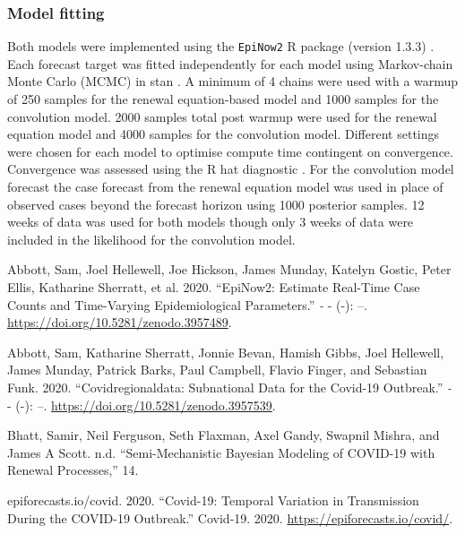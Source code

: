 \hypertarget{model-fitting}{%
\subsubsection*{Model fitting}\label{model-fitting}}

Both models were implemented using the \texttt{EpiNow2} R package (version 1.3.3) \citep{epinow2}. Each forecast target was fitted independently for each model using Markov-chain Monte Carlo (MCMC) in stan \citep{rstan}. A minimum of 4 chains were used with a warmup of 250 samples for the renewal equation-based model and 1000 samples for the convolution model. 2000 samples total post warmup were used for the renewal equation model and 4000 samples for the convolution model. Different settings were chosen for each model to optimise compute time contingent on convergence. Convergence was assessed using the R hat diagnostic \citep{rstan}. For the convolution model forecast the case forecast from the renewal equation model was used in place of observed cases beyond the forecast horizon using 1000 posterior samples. 12 weeks of data was used for both models though only 3 weeks of data were included in the likelihood for the convolution model.

\clearpage

\hypertarget{refs}{}
\leavevmode{}%
Abbott, Sam, Joel Hellewell, Joe Hickson, James Munday, Katelyn Gostic, Peter Ellis, Katharine Sherratt, et al. 2020. {``EpiNow2: Estimate Real-Time Case Counts and Time-Varying Epidemiological Parameters.''} \emph{-} - (-): --. \url{https://doi.org/10.5281/zenodo.3957489}.

\leavevmode{}%
Abbott, Sam, Katharine Sherratt, Jonnie Bevan, Hamish Gibbs, Joel Hellewell, James Munday, Patrick Barks, Paul Campbell, Flavio Finger, and Sebastian Funk. 2020. {``Covidregionaldata: Subnational Data for the Covid-19 Outbreak.''} \emph{-} - (-): --. \url{https://doi.org/10.5281/zenodo.3957539}.

\leavevmode{}%
Bhatt, Samir, Neil Ferguson, Seth Flaxman, Axel Gandy, Swapnil Mishra, and James A Scott. n.d. {``Semi-{Mechanistic Bayesian} Modeling of {COVID-19} with {Renewal Processes},''} 14.

\leavevmode{}%
epiforecasts.io/covid. 2020. {``Covid-19: {Temporal} Variation in Transmission During the {COVID-19} Outbreak.''} {Covid-19}. 2020. \url{https://epiforecasts.io/covid/}.

